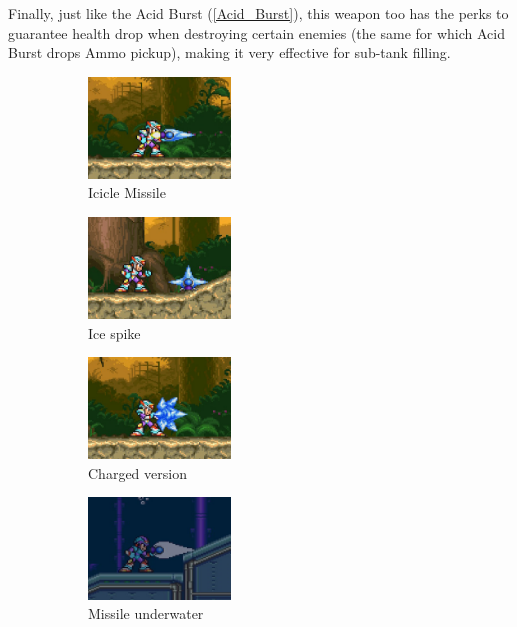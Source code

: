 Finally, just like the Acid Burst (\ref{Acid_Burst}), this weapon too has the perks to guarantee health drop when destroying certain enemies (the same for which Acid Burst drops Ammo pickup), making it very effective for sub-tank filling.

\begin{figure}[htp]
	\centering
	\begin{subfigure}{3.9cm}
		\centering
		\includegraphics[height=2.7cm]{figures/X3/weapons/F_shield.png}
		\caption{Icicle Missile}	
	\end{subfigure}
	\begin{subfigure}{3.9cm}
		\centering
		\includegraphics[height=2.7cm]{figures/X3/weapons/F_shield_1.jpg}
		\caption{Ice spike}	
	\end{subfigure}
	\begin{subfigure}{3.9cm}
		\centering
		\includegraphics[height=2.7cm]{figures/X3/weapons/F_shield_C.png}
		\caption{Charged version}	
	\end{subfigure}
	\begin{subfigure}{3.9cm}
		\centering
		\includegraphics[height=2.7cm]{figures/X3/weapons/F_shield_2.png}
		\caption{Missile underwater}	
	\end{subfigure}
	\begin{subfigure}{3.9cm}
		\centering

\end{subfigure}
\end{figure}
